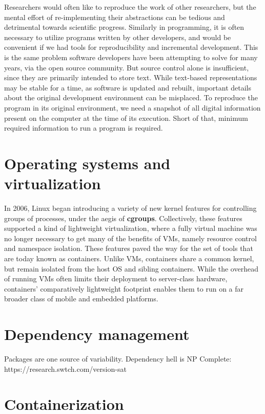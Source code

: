 \documentclass[12pt,initial,twoside,maitrise]{dms}
\numberwithin{equation}{section}
\numberwithin{table}{chapter}
\numberwithin{figure}{chapter}
\begin{document}
Researchers would often like to reproduce the work of other researchers, but the mental effort of re-implementing their abstractions can be tedious and detrimental towards scientific progress. Similarly in programming, it is often necessary to utilize programs written by other developers, and would be convenient if we had tools for reproducibility and incremental development. This is the same problem software developers have been attempting to solve for many years, via the open source community. But source control alone is insufficient, since they are primarily intended to store text. While text-based representations may be stable for a time, as software is updated and rebuilt, important details about the original development environment can be misplaced. To reproduce the program in its original environment, we need a snapshot of all digital information present on the computer at the time of its execution. Short of that, minimum required information to run a program is required.

\section{Operating systems and virtualization}\label{sec:os-and-virtualization}

In 2006, Linux began introducing a variety of new kernel features for controlling groups of processes, under the aegis of \textbf{cgroups}\cite{menage2007adding}. Collectively, these features supported a kind of lightweight virtualization, where a fully virtual machine was no longer necessary to get many of the benefits of VMs, namely resource control and namespace isolation. These features paved the way for the set of tools that are today known as containers. Unlike VMs, containers share a common kernel, but remain isolated from the host OS and sibling containers. While the overhead of running VMs often limits their deployment to server-class hardware, containers' comparatively lightweight footprint enables them to run on a far broader class of mobile and embedded platforms.

\section{Dependency management}\label{sec:dependency-management}

Packages are one source of variability. Dependency hell is NP Complete: https://research.swtch.com/version-sat

\section{Containerization}\label{sec:containerization}
\end{document}
